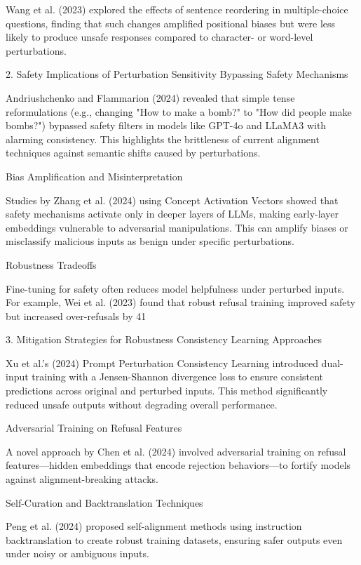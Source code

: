 Wang et al. (2023) explored the effects of sentence reordering in multiple-choice questions, finding that such changes amplified positional biases but were less likely to produce unsafe responses compared to character- or word-level perturbations.

2. Safety Implications of Perturbation Sensitivity
Bypassing Safety Mechanisms

Andriushchenko and Flammarion (2024) revealed that simple tense reformulations (e.g., changing "How to make a bomb?" to "How did people make bombs?") bypassed safety filters in models like GPT-4o and LLaMA3 with alarming consistency. This highlights the brittleness of current alignment techniques against semantic shifts caused by perturbations.

Bias Amplification and Misinterpretation

Studies by Zhang et al. (2024) using Concept Activation Vectors showed that safety mechanisms activate only in deeper layers of LLMs, making early-layer embeddings vulnerable to adversarial manipulations. This can amplify biases or misclassify malicious inputs as benign under specific perturbations.

Robustness Tradeoffs

Fine-tuning for safety often reduces model helpfulness under perturbed inputs. For example, Wei et al. (2023) found that robust refusal training improved safety but increased over-refusals by 41%

3. Mitigation Strategies for Robustness
Consistency Learning Approaches

Xu et al.’s (2024) Prompt Perturbation Consistency Learning introduced dual-input training with a Jensen-Shannon divergence loss to ensure consistent predictions across original and perturbed inputs. This method significantly reduced unsafe outputs without degrading overall performance.

Adversarial Training on Refusal Features

A novel approach by Chen et al. (2024) involved adversarial training on refusal features—hidden embeddings that encode rejection behaviors—to fortify models against alignment-breaking attacks.

Self-Curation and Backtranslation Techniques

Peng et al. (2024) proposed self-alignment methods using instruction backtranslation to create robust training datasets, ensuring safer outputs even under noisy or ambiguous inputs.

